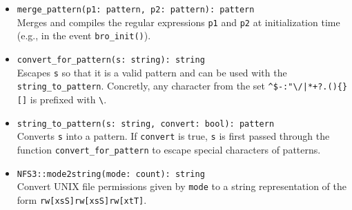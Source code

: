 \documentclass[10pt,landscape]{article}
\newcommand{\verbose}[1]{#1}
\newcommand{\verbose}[1]{}
\begin{document}
\begin{multicols*}{2}
\begin{itemize}
  \item \verb|merge_pattern(p1: pattern, p2: pattern): pattern|\\
    Merges and compiles the regular expressions \verb|p1| and \verb|p2| at
    initialization time (e.g., in the event \verb|bro_init()|).
  \item \verb|convert_for_pattern(s: string): string|\\
    Escapes \verb|s| so that it is a valid pattern and can be used with the
    \verb|string_to_pattern|. Concretly, any character
    from the set \verb#^$-:"\/|*+?.(){}[]# is prefixed with \verb|\|.
  \item \verb|string_to_pattern(s: string, convert: bool): pattern|\\
    Converts \verb|s| into a pattern. If \verb|convert| is true, \verb|s| is
    first passed through the function \verb|convert_for_pattern| to escape
    special characters of patterns.
\verbose{
  \item \verb|NFS3::mode2string(mode: count): string|\\
    Convert UNIX file permissions given by \verb|mode| to a string
    representation of the form \verb|rw[xsS]rw[xsS]rw[xtT]|. 
}
\end{itemize}

\end{multicols*}
\end{document}
